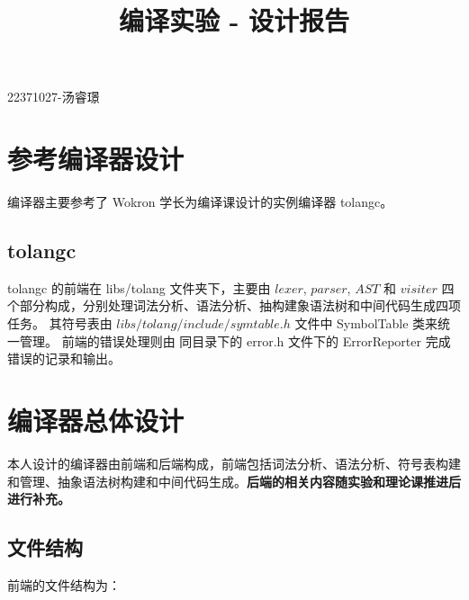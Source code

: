 \documentclass[a4paper]{article}
\title{编译实验 - 设计报告}
\date{}
\begin{document}
	\maketitle
	\vspace{-6em} %
	
	\begin{center}22371027-汤睿璟\end{center}
	
	\section{参考编译器设计}
	
	编译器主要参考了 Wokron 学长为编译课设计的实例编译器 tolangc。
	
		\subsection{tolangc}
		
		tolangc 的前端在 libs/tolang 文件夹下，主要由 $lexer$, $parser$, $AST$ 和 $visiter$ 四个部分构成，分别处理词法分析、语法分析、抽构建象语法树和中间代码生成四项任务。
		其符号表由 $libs/tolang/include/symtable.h$ 文件中 SymbolTable 类来统一管理。
		前端的错误处理则由 同目录下的 error.h 文件下的 ErrorReporter 完成错误的记录和输出。
	
	\section{编译器总体设计}
	
		本人设计的编译器由前端和后端构成，前端包括词法分析、语法分析、符号表构建和管理、抽象语法树构建和中间代码生成。\textbf{后端的相关内容随实验和理论课推进后进行补充。}
		
		\subsection{文件结构}
		
			前端的文件结构为：
			
\end{document}
